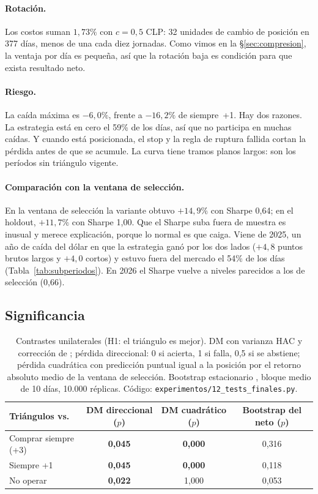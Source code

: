 \documentclass[10pt,a4paper]{article}
\newcommand{\ruta}[1]{\nolinkurl{#1}}
\begin{document}
\paragraph{Rotación.} Los costos suman $1{,}73\%$ con $c=0{,}5$ CLP: 32 unidades de
cambio de posición en 377 días, menos de una cada diez jornadas. Como vimos en la
§\ref{sec:compresion}, la ventaja por día es pequeña, así que la rotación baja es
condición para que exista resultado neto.

\paragraph{Riesgo.} La caída máxima es $-6{,}0\%$, frente a $-16{,}2\%$ de
siempre~+1. Hay dos razones. La estrategia está en cero el 59\% de los días, así que
no participa en muchas caídas. Y cuando está posicionada, el stop y la regla de
ruptura fallida cortan la pérdida antes de que se acumule. La curva tiene tramos
planos largos: son los períodos sin triángulo vigente.

\paragraph{Comparación con la ventana de selección.} En la ventana de selección la
variante obtuvo $+14{,}9\%$ con Sharpe 0,64; en el holdout, $+11{,}7\%$ con Sharpe
1,00. Que el Sharpe suba fuera de muestra es inusual y merece explicación, porque
lo normal es que caiga. Viene de 2025, un año de caída del dólar en que la
estrategia ganó por los dos lados ($+4{,}8$ puntos brutos largos y $+4{,}0$ cortos)
y estuvo fuera del mercado el 54\% de los días (Tabla~\ref{tab:subperiodos}). En
2026 el Sharpe vuelve a niveles parecidos a los de selección (0,66).

\subsection{Significancia}

\begin{table}[htbp]\centering\small
\begin{tabular}{@{}lccc@{}}
\toprule
Triángulos vs. & DM direccional ($p$) & DM cuadrático ($p$) & Bootstrap del neto ($p$) \\
\midrule
Comprar siempre (+3) & \textbf{0{,}045} & \textbf{0{,}000} & 0{,}316 \\
Siempre +1           & \textbf{0{,}045} & \textbf{0{,}000} & 0{,}118 \\
No operar            & \textbf{0{,}022} & 1{,}000 & 0{,}053 \\
\bottomrule
\end{tabular}
\caption{Contrastes unilaterales (H1: el triángulo es mejor). DM con varianza HAC
\citep{neweywest1987} y corrección de \citet{hln1997}; pérdida direccional: 0 si
acierta, 1 si falla, 0,5 si se abstiene; pérdida cuadrática con predicción puntual
igual a la posición por el retorno absoluto medio de la ventana de selección.
Bootstrap estacionario \citep{politisromano1994}, bloque medio de 10 días, 10.000
réplicas. Código: \ruta{experimentos/12_tests_finales.py}.}\label{tab:sig}
\end{table}
\end{document}
